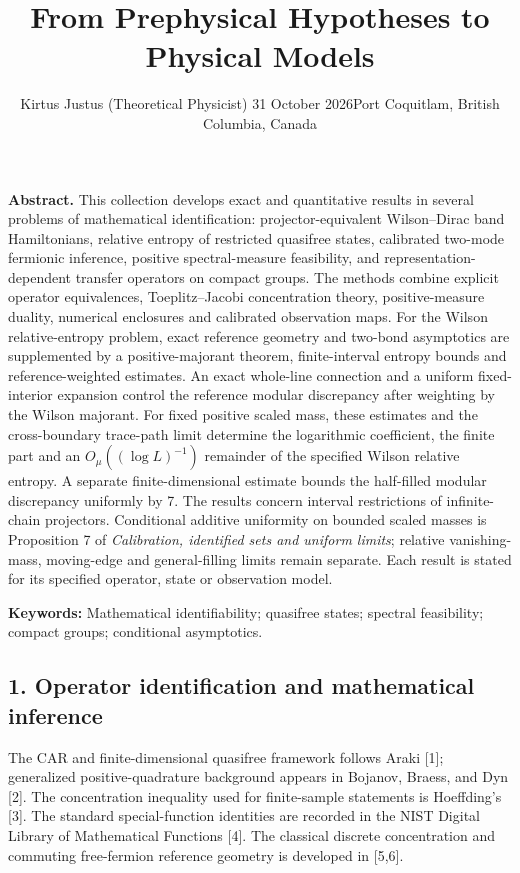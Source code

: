 \documentclass[
  10pt,
  a4paper,
]{article}
\title{From Prephysical Hypotheses to Physical Models}
\author{Kirtus Justus (Theoretical Physicist) \textbullet{} 31 October 2026\tabularnewline Port Coquitlam, British Columbia, Canada}
\date{}
\begin{document}
\maketitle

\textbf{Abstract.} This collection develops exact and quantitative results in several problems of mathematical identification: projector-equivalent Wilson--Dirac band Hamiltonians, relative entropy of restricted quasifree states, calibrated two-mode fermionic inference, positive spectral-measure feasibility, and representation-dependent transfer operators on compact groups. The methods combine explicit operator equivalences, Toeplitz--Jacobi concentration theory, positive-measure duality, numerical enclosures and calibrated observation maps. For the Wilson relative-entropy problem, exact reference geometry and two-bond asymptotics are supplemented by a positive-majorant theorem, finite-interval entropy bounds and reference-weighted estimates. An exact whole-line connection and a uniform fixed-interior expansion control the reference modular discrepancy after weighting by the Wilson majorant. For fixed positive scaled mass, these estimates and the cross-boundary trace-path limit determine the logarithmic coefficient, the finite part and an \(O_\mu((\log L)^{-1})\) remainder of the specified Wilson relative entropy. A separate finite-dimensional estimate bounds the half-filled modular discrepancy uniformly by 7. The results concern interval restrictions of infinite-chain projectors. Conditional additive uniformity on bounded scaled masses is Proposition 7 of \emph{Calibration, identified sets and uniform limits}; relative vanishing-mass, moving-edge and general-filling limits remain separate. Each result is stated for its specified operator, state or observation model.

\textbf{Keywords:} Mathematical identifiability; quasifree states; spectral feasibility; compact groups; conditional asymptotics.

\subsection{1. Operator identification and mathematical inference}\label{operator-identification-and-mathematical-inference}

The CAR and finite-dimensional quasifree framework follows Araki {[}1{]}; generalized positive-quadrature background appears in Bojanov, Braess, and Dyn {[}2{]}. The concentration inequality used for finite-sample statements is Hoeffding's {[}3{]}. The standard special-function identities are recorded in the NIST Digital Library of Mathematical Functions {[}4{]}. The classical discrete concentration and commuting free-fermion reference geometry is developed in {[}5,6{]}.
\end{document}
